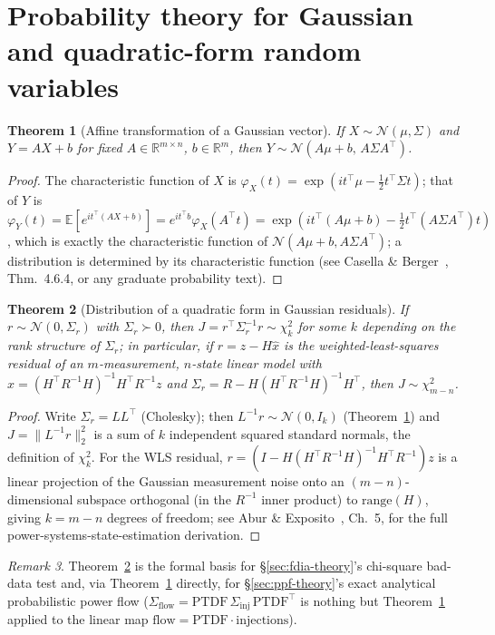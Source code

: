 \documentclass[11pt]{report}
\theoremstyle{plain}
\newtheorem{theorem}{Theorem}[chapter]
\theoremstyle{definition}
\theoremstyle{remark}
\newtheorem{remark}[theorem]{Remark}
\begin{document}
\section{Probability theory for Gaussian and quadratic-form random variables}
\label{sec:prob-prelim}

\begin{theorem}[Affine transformation of a Gaussian vector]
\label{thm:affine-gaussian}
If $X\sim\mathcal N(\mu,\Sigma)$ and $Y=AX+b$ for fixed $A\in
\mathbb{R}^{m\times n}$, $b\in\mathbb{R}^m$, then
$Y\sim\mathcal{N}(A\mu+b,\,A\Sigma A^\top)$.
\end{theorem}
\begin{proof}
The characteristic function of $X$ is
$\varphi_X(t)=\exp(it^\top\mu-\tfrac12t^\top\Sigma t)$; that of $Y$ is
$\varphi_Y(t)=\mathbb E[e^{it^\top(AX+b)}]=e^{it^\top
b}\varphi_X(A^\top t)=\exp\left(it^\top(A\mu+b)-\tfrac12t^\top
(A\Sigma A^\top)t\right)$, which is exactly the characteristic function of
$\mathcal N(A\mu+b,A\Sigma A^\top)$; a distribution is determined by its
characteristic function (see Casella \& Berger~\cite{casellaberger},
Thm.~4.6.4, or any graduate probability text).
\end{proof}

\begin{theorem}[Distribution of a quadratic form in Gaussian residuals]
\label{thm:chisquare}
If $r\sim\mathcal N(0,\Sigma_r)$ with $\Sigma_r\succ0$, then
$J=r^\top\Sigma_r^{-1}r\sim\chi^2_k$ for some $k$ depending on the rank
structure of $\Sigma_r$; in particular, if $r=z-H\hat x$ is the
weighted-least-squares residual of an $m$-measurement, $n$-state linear
model with $\hat x=(H^\top R^{-1}H)^{-1}H^\top R^{-1}z$ and
$\Sigma_r=R-H(H^\top R^{-1}H)^{-1}H^\top$, then $J\sim\chi^2_{m-n}$.
\end{theorem}
\begin{proof}
Write $\Sigma_r=LL^\top$ (Cholesky); then $L^{-1}r\sim\mathcal
N(0,I_k)$ (Theorem~\ref{thm:affine-gaussian}) and $J=\|L^{-1}r\|_2^2$ is
a sum of $k$ independent squared standard normals, the definition of
$\chi^2_k$. For the WLS residual, $r=(I-H(H^\top
R^{-1}H)^{-1}H^\top R^{-1})z$ is a linear projection of the Gaussian
measurement noise onto an $(m-n)$-dimensional subspace orthogonal (in the
$R^{-1}$ inner product) to $\text{range}(H)$, giving $k=m-n$ degrees of
freedom; see Abur \& Exposito~\cite{aburexposito}, Ch.~5, for the full
power-systems-state-estimation derivation.
\end{proof}

\begin{remark}
Theorem~\ref{thm:chisquare} is the formal basis for
\S\ref{sec:fdia-theory}'s chi-square bad-data test and, via
Theorem~\ref{thm:affine-gaussian} directly, for
\S\ref{sec:ppf-theory}'s exact analytical probabilistic power flow
($\Sigma_{\text{flow}}=\text{PTDF}\,\Sigma_{\text{inj}}\,
\text{PTDF}^\top$ is nothing but Theorem~\ref{thm:affine-gaussian}
applied to the linear map $\text{flow}=\text{PTDF}\cdot
\text{injections}$).
\end{remark}
\end{document}
